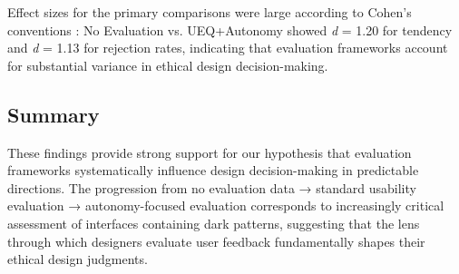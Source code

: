 Effect sizes for the primary comparisons were large according to Cohen's conventions \cite{cohen1988statistical}: No Evaluation vs. UEQ+Autonomy showed \textit{d} = 1.20 for tendency and \textit{d} = 1.13 for rejection rates, indicating that evaluation frameworks account for substantial variance in ethical design decision-making.

\subsection{Summary}

These findings provide strong support for our hypothesis that evaluation frameworks systematically influence design decision-making in predictable directions. The progression from no evaluation data → standard usability evaluation → autonomy-focused evaluation corresponds to increasingly critical assessment of interfaces containing dark patterns, suggesting that the lens through which designers evaluate user feedback fundamentally shapes their ethical design judgments.
